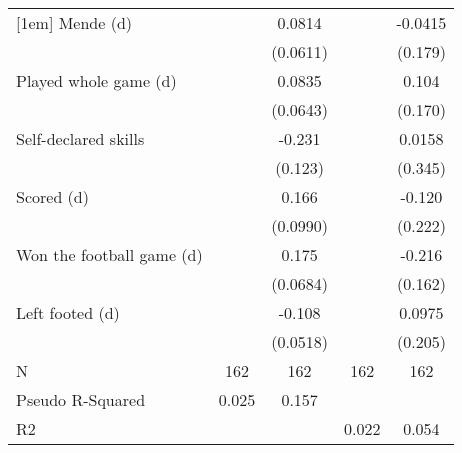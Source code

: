 {\begin{tabular}{l*{4}{c}}
[1em]
Mende (d)           &                     &      0.0814         &                     &     -0.0415         \\
                    &                     &    (0.0611)         &                     &     (0.179)         \\
[1em]
Played whole game (d)&                     &      0.0835         &                     &       0.104         \\
                    &                     &    (0.0643)         &                     &     (0.170)         \\
[1em]
Self-declared skills&                     &      -0.231\sym{*}  &                     &      0.0158         \\
                    &                     &     (0.123)         &                     &     (0.345)         \\
[1em]
Scored (d)          &                     &       0.166\sym{*}  &                     &      -0.120         \\
                    &                     &    (0.0990)         &                     &     (0.222)         \\
[1em]
Won the football game (d)&                     &       0.175\sym{**} &                     &      -0.216         \\
                    &                     &    (0.0684)         &                     &     (0.162)         \\
[1em]
Left footed (d)     &                     &      -0.108\sym{**} &                     &      0.0975         \\
                    &                     &    (0.0518)         &                     &     (0.205)         \\
\hline
N                   &         162         &         162         &         162         &         162         \\
Pseudo R-Squared    &       0.025         &       0.157         &                     &                     \\
R2                  &                     &                     &       0.022         &       0.054         \\
\hline\hline
\end{tabular}
}
